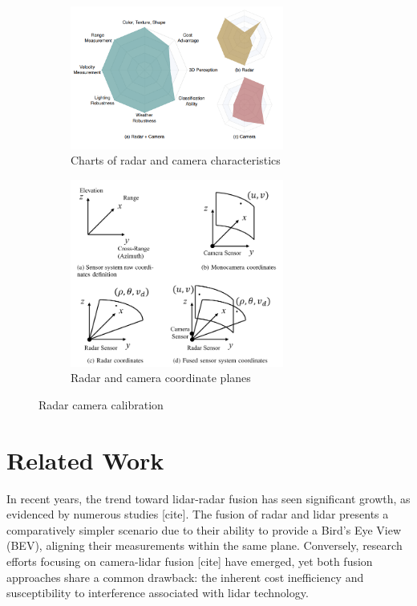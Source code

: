 \begin{figure}[hbpt]
    \centering
    \begin{subfigure}{0.3\linewidth}
        \includegraphics[width=7cm]{Figures/trade_off.png}
        \caption{Charts of radar and camera characteristics\cite{Yao_2023}}
        \label{subfig:trade_off_sub}
    \end{subfigure}
    \hspace{0.2\textwidth}
    \begin{subfigure}{0.3\linewidth}
        \includegraphics[width=7cm]{Figures/cam_radar_coordinates.png}
        \caption{Radar and camera coordinate planes\cite{8844649}}
        \label{subfig:cam_radar_sub}
    \end{subfigure}

    \caption{Radar camera calibration}
    \label{fig:trade_off_and_plane}
\end{figure}




\section{Related Work}\label{sec:1-related_work}
In recent years, the trend toward lidar-radar fusion has seen significant growth, as evidenced by numerous studies [cite]. 
The fusion of radar and lidar presents a comparatively simpler scenario due to their ability to provide a Bird's Eye View (BEV), 
aligning their measurements within the same plane. Conversely, research efforts focusing on camera-lidar fusion [cite] have emerged, 
yet both fusion approaches share a common drawback:
the inherent cost inefficiency and susceptibility to interference associated with lidar technology.


